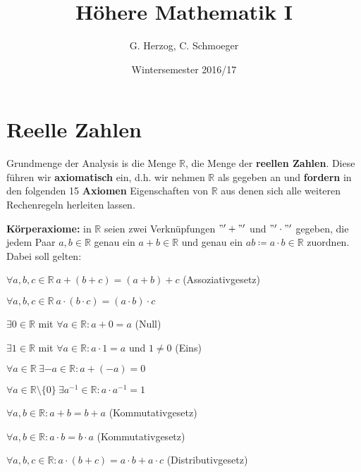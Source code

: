 \documentclass[14pt,titlepage,ngerman,a4paper,headsepline,DIV15,halfparskip*]{scrartcl}
\title{Höhere Mathematik I}
\author{G. Herzog, C. Schmoeger}
\date{Wintersemester 2016/17}
\newcommand{\R}{\mathbb{R}}
\theoremstyle{named}
\theoremstyle{dotless}
\begin{document}
\maketitle
	
\tableofcontents
 \newpage 
  
\section{Reelle Zahlen}

Grundmenge der Analysis is die Menge $\R$, die Menge der \textbf{reellen Zahlen}. Diese führen wir \textbf{axiomatisch} ein, d.h. wir nehmen $\R$ als gegeben an und \textbf{fordern} in den folgenden 15 \textbf{Axiomen} Eigenschaften von $\R$ aus denen sich alle weiteren Rechenregeln herleiten lassen.
\newline

\textbf{Körperaxiome:} in $\R$ seien zwei Verknüpfungen $"'+"'$ und $"'\cdot"'$ gegeben, die jedem Paar $a, b \in \R$ genau ein $a + b \in \R$ und genau ein $a b \coloneqq a \cdot b \in \R$ zuordnen. Dabei soll gelten:


\begin{description} \addtolength{\itemindent}{0.4cm} \label{k.axiom}
	\item[$(A1)$] $\forall a, b, c \in \R \: a + \left( b + c \right) = \left( a + b \right) + c$  (Assoziativgesetz) \label{k.axiom-a1}
	\item[$(A5)$] $\forall a, b, c \in \R \: a \cdot \left( b \cdot c \right) = \left( a \cdot b \right) \cdot c$ \label{k.axiom-a5}
	\item[$(A2)$] $\exists 0 \in \R$ mit $\forall a \in \R : a + 0 = a$ (Null) \label{k.axiom-a2}
	\item[$(A6)$] $\exists 1 \in \R$ mit $\forall a \in \R : a \cdot 1 = a$ und $1 \neq 0$ (Eins) \label{k.axiom-a6}
	\item[$(A3)$] $\forall a \in \R ~ \exists -a \in \R : a + (-a) = 0$ \label{k.axiom-a3}
	\item[$(A7)$] $\forall a \in \R \setminus \{ 0 \} ~ \exists a^{-1} \in \R : a \cdot a^{-1} = 1$ \label{k.axiom-a7}
	\item[$(A4)$] $\forall a, b \in \R : a + b = b + a$ (Kommutativgesetz) \label{k.axiom-a4}
	\item[$(A8)$] $\forall a, b \in \R : a \cdot b = b \cdot a$ \label{k.axiom-a8}(Kommutativgesetz)
	\item[$(A9)$] $\forall a, b, c \in \R : a \cdot (b + c) = a \cdot b + a \cdot c$ (Distributivgesetz) \label{k.axiom-a9}
\end{description}
\end{document}
